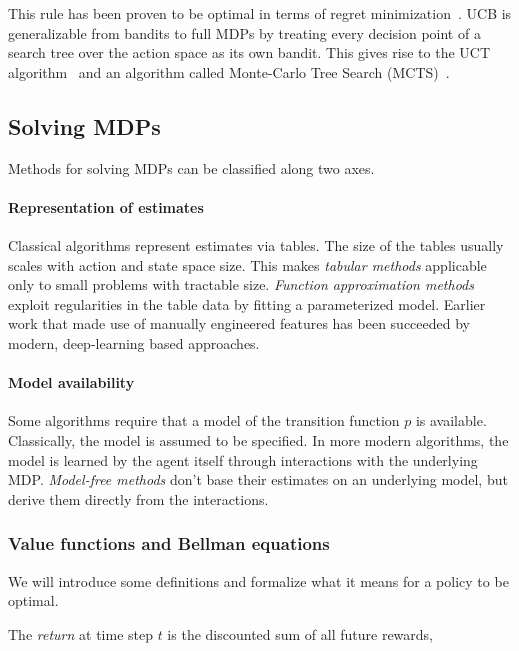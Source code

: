 This rule has been proven to be optimal in terms of regret minimization~\cite{auer_finite-time_nodate}.
UCB is generalizable from bandits to full MDPs by treating every decision point
of a search tree over the action space as its own bandit.
This gives rise to the UCT algorithm~\cite{hutchison_bandit_2006} and an
algorithm called Monte-Carlo Tree Search (MCTS)~\cite{hutchison_efficient_2007}.

\subsection{Solving MDPs}\label{sec:rl-solving}

Methods for solving MDPs can be classified along two axes.

\paragraph{Representation of estimates}
Classical algorithms represent estimates via tables.
The size of the tables usually scales with action and state space size.
This makes \emph{tabular methods} applicable only to small problems with tractable size.
\emph{Function approximation methods} exploit regularities in the table data by fitting a parameterized model.
Earlier work that made use of manually engineered features has been succeeded by modern, deep-learning based approaches.

\paragraph{Model availability}
Some algorithms require that a model of the transition function $p$ is available.
Classically, the model is assumed to be specified. In more modern algorithms,
the model is learned by the agent itself through interactions with the underlying MDP.
\emph{Model-free methods} don't base their estimates on an underlying model, but
derive them directly from the interactions.



\subsubsection{Value functions and Bellman equations}\label{sec:rl-value-functions}

We will introduce some definitions and formalize what it means for a policy to be optimal.

The \emph{return} at time step $t$ is the discounted sum of all future rewards,

